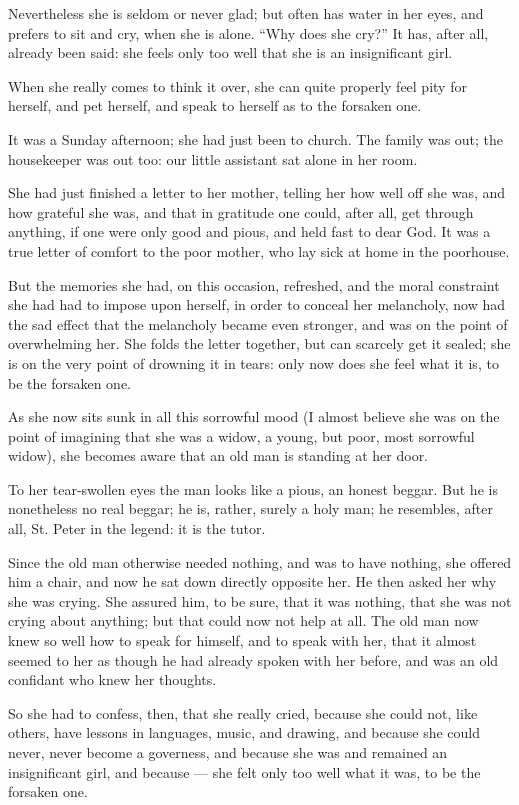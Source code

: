 \documentclass[12pt,a4paper]{book}
\begin{document}
Nevertheless she is seldom or never glad; but often has water in her eyes, and prefers to sit and cry, when she is alone. ``Why does she cry?'' It has, after all, already been said: she feels only too well that she is an insignificant girl.

When she really comes to think it over, she can quite properly feel pity for herself, and pet herself, and speak to herself as to the forsaken one.

It was a Sunday afternoon; she had just been to church. The family was out; the housekeeper was out too: our little assistant sat alone in her room.

She had just finished a letter to her mother, telling her how well off she was, and how grateful she was, and that in gratitude one could, after all, get through anything, if one were only good and pious, and held fast to dear God. It was a true letter of comfort to the poor mother, who lay sick at home in the poorhouse.

But the memories she had, on this occasion, refreshed, and the moral constraint she had had to impose upon
herself, in order to conceal her melancholy, now had the sad effect that the melancholy became even stronger, and was on the point of overwhelming her. She folds the letter together, but can scarcely get it sealed; she is on the very point of drowning it in tears: only now does she feel what it is, to be the forsaken one.

As she now sits sunk in all this sorrowful mood (I almost believe she was on the point of imagining that she was a widow, a young, but poor, most sorrowful widow), she becomes aware that an old man is standing at her door.

To her tear-swollen eyes the man looks like a pious, an honest beggar. But he is nonetheless no real beggar; he is, rather, surely a holy man; he resembles, after all, St. Peter in the legend: it is the tutor.

Since the old man otherwise needed nothing, and was to have nothing, she offered him a chair, and now he sat down directly opposite her. He then asked her why she was crying. She assured him, to be sure, that it was nothing, that she was not crying about anything; but that could now not help at all. The old man now knew so well how to speak for himself, and to speak with her, that it almost seemed to her as though he had already spoken with her before, and was an old confidant who knew her thoughts.

So she had to confess, then, that she really cried, because she could not, like others, have lessons in languages, music, and drawing, and because she could never, never become a governess, and because she was and remained an insignificant girl, and because --- she felt only too well what it was, to be the forsaken one.
\end{document}

